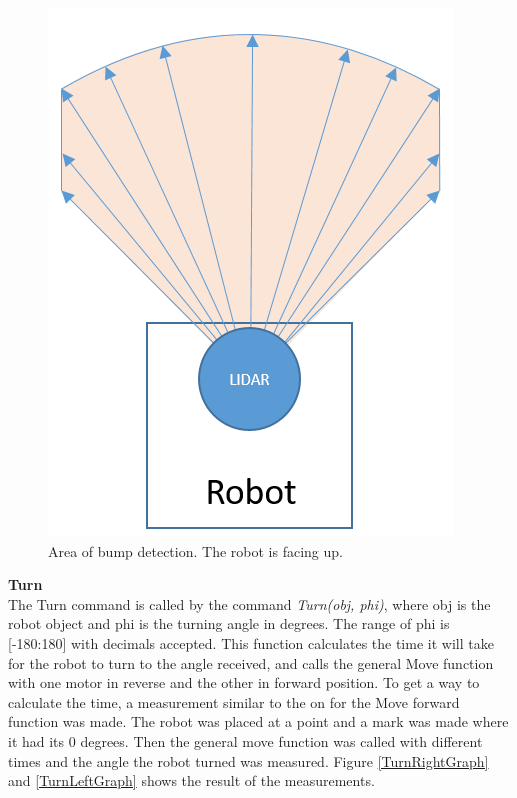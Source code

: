 \begin{figure}[H]
\centering
\includegraphics[scale=0.7]{billeder/MotionBumper.png}
\caption{Area of bump detection. The robot is facing up.}\label{MotionBumper}
\end{figure} 

\textbf{Turn}\\
The Turn command is called by the command \textit{Turn(obj, phi)}, where obj is the robot object and phi is the turning angle in degrees. The range of phi is [-180:180] with decimals accepted. This function calculates the time it will take for the robot to turn to the angle received, and calls the general Move function with one motor in reverse and the other in forward position. 
To get a way to calculate the time, a measurement similar to the on for the Move forward function was made. The robot was placed at a point and a mark was made where it had its 0 degrees. Then the general move function was called with different times and the angle the robot turned was measured. Figure \ref{TurnRightGraph} and \ref{TurnLeftGraph} shows the result of the measurements.

